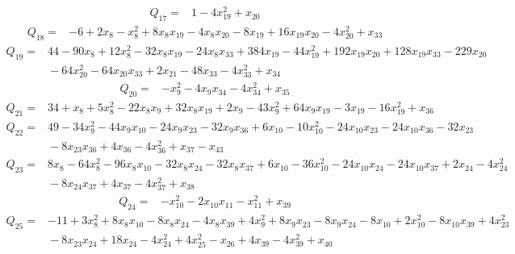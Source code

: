 \documentclass[11pt]{article}
\theoremstyle{definition}\newtheorem{definition}[theorem]{Definition}
\begin{document}
{\begin{align*}
 Q_{17}={}&1 -4x_{19}^{2} +x_{20}
\end{align*}
\begin{align*}
 Q_{18}={}&-6 +2x_{8} -x_{8}^{2} +8x_{8}x_{19} -4x_{8}x_{20} -8x_{19} +16x_{19}x_{20} -4x_{20}^{2} +x_{33}
\end{align*}
\begin{align*}
 Q_{19}={}&44 -90x_{8} +12x_{8}^{2} -32x_{8}x_{19} -24x_{8}x_{33} +384x_{19} -44x_{19}^{2} +192x_{19}x_{20} +128x_{19}x_{33} -229x_{20}\\
 &{}-64x_{20}^{2} -64x_{20}x_{33} +2x_{21} -48x_{33} -4x_{33}^{2} +x_{34}
\end{align*}
\begin{align*}
 Q_{20}={}&-x_{9}^{2} -4x_{9}x_{34} -4x_{34}^{2} +x_{35}
\end{align*}
\begin{align*}
 Q_{21}={}&34 +x_{8} +5x_{8}^{2} -22x_{8}x_{9} +32x_{8}x_{19} +2x_{9} -43x_{9}^{2} +64x_{9}x_{19} -3x_{19} -16x_{19}^{2} +x_{36}
\end{align*}
\begin{align*}
 Q_{22}={}&49 -34x_{9}^{2} -44x_{9}x_{10} -24x_{9}x_{23} -32x_{9}x_{36} +6x_{10} -10x_{10}^{2} -24x_{10}x_{23} -24x_{10}x_{36} -32x_{23}\\
 &{}-8x_{23}x_{36} +4x_{36} -4x_{36}^{2} +x_{37} -x_{43}
\end{align*}
\begin{align*}
 Q_{23}={}&8x_{8} -64x_{8}^{2} -96x_{8}x_{10} -32x_{8}x_{24} -32x_{8}x_{37} +6x_{10} -36x_{10}^{2} -24x_{10}x_{24} -24x_{10}x_{37} +2x_{24} -4x_{24}^{2}\\
 &{}-8x_{24}x_{37} +4x_{37} -4x_{37}^{2} +x_{38}
\end{align*}
\begin{align*}
 Q_{24}={}&-x_{10}^{2} -2x_{10}x_{11} -x_{11}^{2} +x_{39}
\end{align*}
\begin{align*}
 Q_{25}={}&-11 +3x_{8}^{2} +8x_{8}x_{10} -8x_{8}x_{24} -4x_{8}x_{39} +4x_{9}^{2} +8x_{9}x_{23} -8x_{9}x_{24} -8x_{10} +2x_{10}^{2} -8x_{10}x_{39} +4x_{23}^{2}\\
 &{}-8x_{23}x_{24} +18x_{24} -4x_{24}^{2} +4x_{25}^{2} -x_{26} +4x_{39} -4x_{39}^{2} +x_{40}
\end{align*}
}
\end{document}
